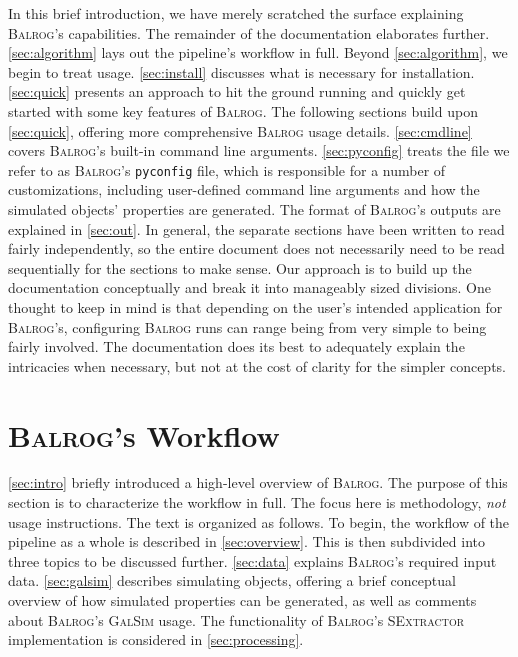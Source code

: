 \documentclass[11pt]{book}
\newcommand{\codett}[1]{\lstinline{#1}}
\newcommand{\pyconfig}{\codett{pyconfig}}
\newcommand{\galsim}{\textsc{GalSim}}
\newcommand{\balrog}{\textsc{Balrog}}
\newcommand{\sex}{\textsc{SExtractor}}
\begin{document}
In this brief introduction, we have merely scratched the surface explaining \balrog{}'s capabilities. 
The remainder of the documentation elaborates further.
\autoref{sec:algorithm} lays out the pipeline's workflow in full.
Beyond \autoref{sec:algorithm}, we begin to treat usage.
\autoref{sec:install} discusses what is necessary for installation.
\autoref{sec:quick} presents an approach to hit the ground running and quickly get started with some key features of \balrog{}.
The following sections build upon \autoref{sec:quick}, offering more comprehensive \balrog{} usage details.
\autoref{sec:cmdline} covers \balrog{}'s built-in command line arguments.
\autoref{sec:pyconfig} treats the file we refer to as \balrog{}'s \pyconfig{} file, which is responsible for a number of customizations,
including user-defined command line arguments and how the simulated objects' properties are generated.
The format of \balrog{}'s outputs are explained in \autoref{sec:out}.
In general, the separate sections have been written to read fairly independently,
so the entire document does not necessarily need to be read sequentially for the sections to make sense.
Our approach is to build up the documentation conceptually and break it into manageably sized divisions.
One thought to keep in mind is that depending on the user's intended application for \balrog{}'s,
configuring \balrog{} runs can range being from very simple to being fairly involved.
The documentation does its best to adequately explain the intricacies when necessary,
but not at the cost of clarity for the simpler concepts.


\chapter{\balrog{}'s Workflow}
\label{sec:algorithm}

\autoref{sec:intro} briefly introduced a high-level overview of \balrog{}.
The purpose of this section is to characterize the workflow in full.
The focus here is methodology, \textit{not} usage instructions. 
The text is organized as follows.
To begin, the workflow of the pipeline as a whole is described in \autoref{sec:overview}.
This is then subdivided into three topics to be discussed further.
\autoref{sec:data} explains \balrog{}'s required input data.
\autoref{sec:galsim} describes simulating objects,
offering a brief conceptual overview of how simulated properties can be generated, as well as comments about \balrog{}'s \galsim{} usage.
The functionality of \balrog{}'s \sex{} implementation is considered in \autoref{sec:processing}.
\end{document}
